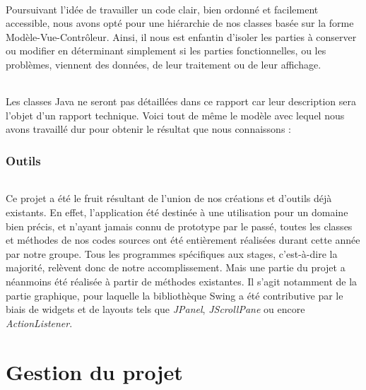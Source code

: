 \documentclass[a4paper,10pt]{report}
\begin{document}
      \paragraph{}
	Poursuivant l'idée de travailler un code clair, bien ordonné et facilement accessible, nous avons opté pour une hiérarchie de nos classes basée sur la forme Modèle-Vue-Contrôleur.
	Ainsi, il nous est enfantin d'isoler les parties à conserver ou modifier en déterminant simplement si les parties fonctionnelles, ou les problèmes, viennent des données, de leur traitement ou de leur affichage.
      
      \paragraph{}
	Les classes Java ne seront pas détaillées dans ce rapport car leur description sera l'objet d'un rapport technique.
	Voici tout de même le modèle avec lequel nous avons travaillé dur pour obtenir le résultat que nous connaissons :
	
	
	
	
	
	
    \section{Outils}
      \paragraph{}
	Ce projet a été le fruit résultant de l'union de nos créations et d'outils déjà existants. 
	En effet, l'application été destinée à une utilisation pour un domaine bien précis, et n'ayant jamais connu de prototype par le passé, toutes les classes et méthodes de nos codes sources ont été entièrement réalisées durant cette année par notre groupe.
	Tous les programmes spécifiques aux stages, c'est-à-dire la majorité, relèvent donc de notre accomplissement.
	Mais une partie du projet a néanmoins été réalisée à partir de méthodes existantes. 
	Il s'agit notamment de la partie graphique, pour laquelle la bibliothèque Swing a été contributive par le biais de widgets et de layouts tels que \textit{JPanel}, \textit{JScrollPane} ou encore \textit{ActionListener}.
	
	
		
\part{Gestion du projet}
\end{document}
